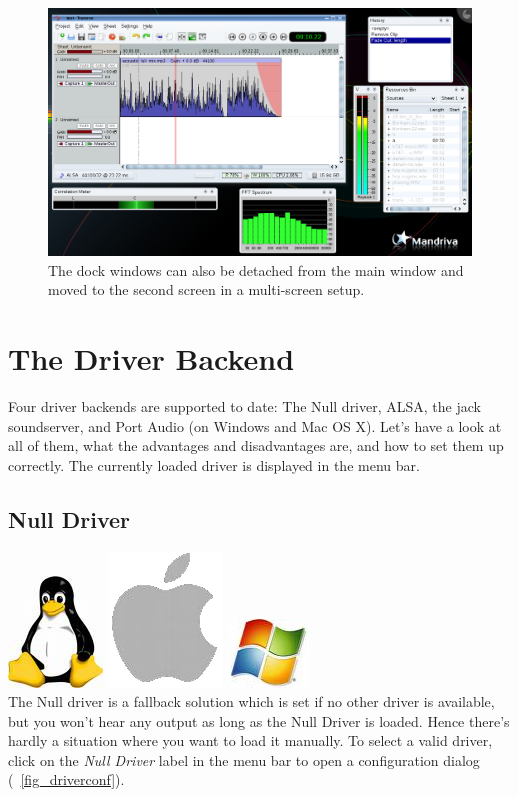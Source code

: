 \begin{figure}
 \centering\includegraphics[width=\textwidth]{images/sshot03.png}
 \caption{The dock windows can also be detached from the main window and moved to the second screen in a multi-screen setup.}
 \label{fig_mainwin02}
\end{figure}

\section{The Driver Backend}
Four driver backends are supported to date: The Null driver, ALSA, the jack soundserver, and Port Audio (on Windows and Mac OS X). Let's have a look at all of them, what the advantages and disadvantages are, and how to set them up correctly. The currently loaded driver is displayed in the menu bar.

\subsection{Null Driver}
\includegraphics[height=\baselineskip]{images/tux.png}
\includegraphics[height=\baselineskip]{images/mac.png}
\includegraphics[height=\baselineskip]{images/win.png}
\\
The Null driver is a fallback solution which is set if no other driver is available, but you won't hear any output as long as the Null Driver is loaded. Hence there's hardly a situation where you want to load it manually. To select a valid driver, click on the \emph{Null Driver} label in the menu bar to open a configuration dialog (\FigB\ \ref{fig_driverconf}).

